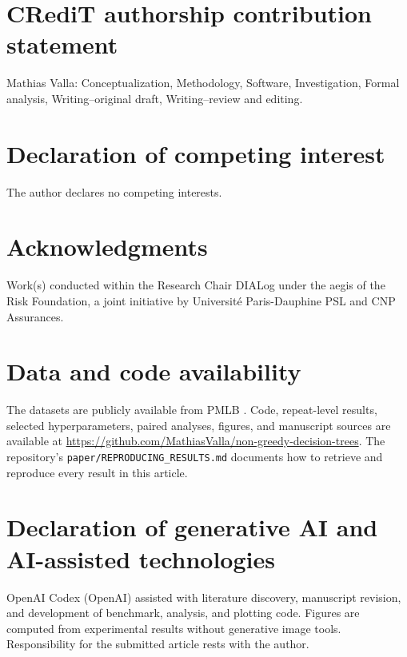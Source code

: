 \documentclass[final,5p,times]{elsarticle}
\begin{document}
\section*{CRediT authorship contribution statement}
Mathias Valla: Conceptualization, Methodology, Software, Investigation, Formal analysis, Writing--original draft, Writing--review and editing.
\section*{Declaration of competing interest}
The author declares no competing interests.
\section*{Acknowledgments}
Work(s) conducted within the Research Chair DIALog under the aegis of the Risk Foundation, a joint initiative by Universit{\'e} Paris-Dauphine PSL and CNP Assurances.
\section*{Data and code availability}
The datasets are publicly available from PMLB \cite{olson2017pmlb}. Code, repeat-level results, selected hyperparameters, paired analyses, figures, and manuscript sources are available at \url{https://github.com/MathiasValla/non-greedy-decision-trees}. The repository's \texttt{paper/REPRODUCING\_RESULTS.md} documents how to retrieve and reproduce every result in this article.
\section*{Declaration of generative AI and AI-assisted technologies}
OpenAI Codex (OpenAI) assisted with literature discovery, manuscript revision, and development of benchmark, analysis, and plotting code. Figures are computed from experimental results without generative image tools. Responsibility for the submitted article rests with the author.
\end{document}
